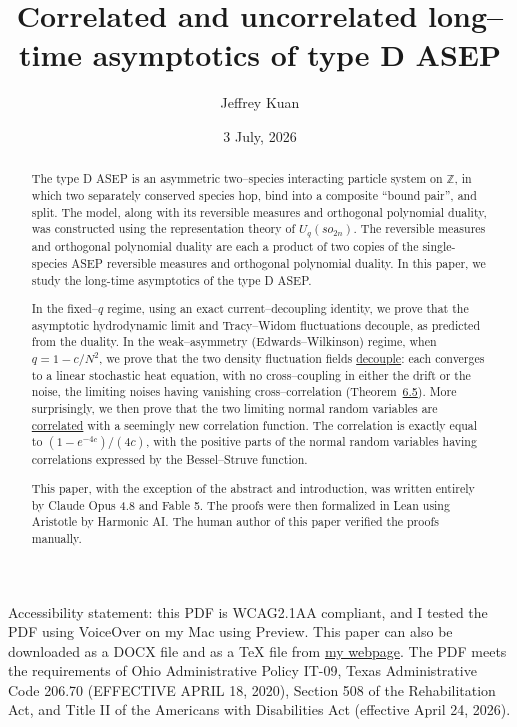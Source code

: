 \documentclass[11pt]{article}
\title{\bf Correlated and uncorrelated long--time asymptotics of type D ASEP}
\author{Jeffrey Kuan}
\date{3 July, 2026}
\theoremstyle{plain}
\theoremstyle{definition}
\theoremstyle{remark}
\newcommand{\Z}{\mathbb{Z}}\newcommand{\R}{\mathbb{R}}\newcommand{\N}{\mathbb{N}}
\begin{document}
Accessibility statement: this PDF is WCAG2.1AA compliant, and I tested the PDF using VoiceOver on my Mac using Preview.  This paper can also be downloaded as a DOCX file and as a TeX file from \href{https://u.osu.edu/jkuanpapers/type_d_asep/}{my webpage}. The PDF meets the requirements of Ohio Administrative Policy IT-09, Texas Administrative Code 206.70 (EFFECTIVE APRIL 18, 2020), Section 508 of the Rehabilitation Act, and Title II of the Americans with Disabilities Act (effective April 24, 2026). 


\maketitle

\begin{abstract}
The type D ASEP is an asymmetric  two--species interacting particle system on $\Z$, in which two separately conserved species hop, bind into a composite ``bound pair'', and split. The model, along with its reversible measures and orthogonal polynomial duality, was constructed using the representation theory of $U_q(so_{2n})$. The reversible measures and orthogonal polynomial duality are each a product of two copies of the single-species ASEP reversible measures and orthogonal polynomial duality. In this paper, we study the long-time asymptotics of the type D ASEP. 

In the fixed--$q$ regime, using an exact current--decoupling identity, we prove that the asymptotic hydrodynamic limit and Tracy--Widom fluctuations decouple, as predicted from the duality. In the weak--asymmetry (Edwards--Wilkinson) regime, when $q=1-c/N^2$, we prove
that the two density fluctuation fields \underline{decouple}: each converges to a linear
stochastic heat equation, with no cross--coupling in either the drift or the noise,
the limiting noises having vanishing cross--correlation (Theorem~\hyperref[thm_ewmain]{6.5}).
More surprisingly, we then prove that the two limiting normal random variables are \underline{correlated} with a seemingly new correlation function. The correlation is exactly equal to $(1-e^{-4c})/(4c)$, with the positive parts of the normal random variables having correlations expressed by the Bessel--Struve function. 

This paper, with the exception of the abstract and introduction, was written entirely by Claude Opus 4.8 and Fable 5. The proofs were then formalized in Lean using Aristotle by Harmonic AI. The human author of this paper verified the proofs manually.

\end{abstract}
\end{document}
